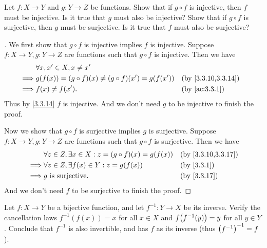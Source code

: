 \begin{ex}\label{ex:3.3.5}
  Let \(f : X \to Y\) and \(g : Y \to Z\) be functions.
  Show that if \(g \circ f\) is injective, then \(f\) must be injective.
  Is it true that \(g\) must also be injective?
  Show that if \(g \circ f\) is surjective, then \(g\) must be surjective.
  Is it true that \(f\) must also be surjective?
\end{ex}

\begin{proof}[]
  We first show that \(g \circ f\) is injective implies \(f\) is injective.
  Suppose \(f : X \to Y, g : Y \to Z\) are functions such that \(g \circ f\) is injective.
  Then we have
  \begin{align*}
             & \forall x, x' \in X, x \neq x'                                                   \\
    \implies & g(f(x)) = (g \circ f)(x) \neq (g \circ f)(x') = g(f(x')) &  & \by{3.3.10,3.3.14} \\
    \implies & f(x) \neq f(x').                                         &  & \by{ac:3.3.1}
  \end{align*}
  Thus by \cref{3.3.14} \(f\) is injective.
  And we don't need \(g\) to be injective to finish the proof.

  Now we show that \(g \circ f\) is surjective implies \(g\) is surjective.
  Suppose \(f : X \to Y, g : Y \to Z\) are functions such that \(g \circ f\) is surjective.
  Then we have
  \begin{align*}
             & \forall z \in Z, \exists x \in X : z = (g \circ f)(x) = g(f(x)) &  & \by{3.3.10,3.3.17} \\
    \implies & \forall z \in Z, \exists f(x) \in Y : z = g(f(x))               &  & \by{3.3.1}         \\
    \implies & g \text{ is surjective}.                                        &  & \by{3.3.17}
  \end{align*}
  And we don't need \(f\) to be surjective to finish the proof.
\end{proof}

\begin{ex}\label{ex:3.3.6}
  Let \(f : X \to Y\) be a bijective function, and let \(f^{-1} : Y \to X\) be its inverse.
  Verify the cancellation laws \(f^{-1}(f(x)) = x\) for all \(x \in X\) and \(f\pa{f^{-1}(y)} = y\) for all \(y \in Y\).
  Conclude that \(f^{-1}\) is also invertible, and has \(f\) as its inverse (thus \(\left\lparen f^{-1}\right\rparen^{-1} = f\)).
\end{ex}

